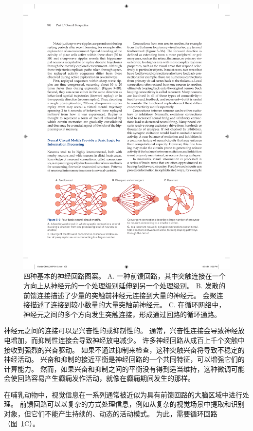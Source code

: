 \begin{figure}[htbp]
	\centering
	\includegraphics[width=1.0\linewidth]{chap05/fig_5_3}
	\caption{四种基本的神经回路图案。 
		A. 一种前馈回路，其中突触连接在一个方向上从神经元的一个处理级别延伸到另一个处理级别。 
		B. 发散的前馈连接描述了少量的突触前神经元连接到大量的神经元。 会聚连接描述了连接到较小数量的大量突触前神经元。 
		C. 在循环网络中，神经元之间的多个方向发生突触连接，形成通过回路的循环通路。}
	\label{fig:5_3}
\end{figure}


神经元之间的连接可以是兴奋性的或抑制性的。
通常，兴奋性连接会导致神经放电增加，而抑制性连接会导致神经放电减少。
许多神经回路从成百上千个突触中接收到强烈的兴奋驱动。
如果不通过抑制来检查，这种突触兴奋将导致不稳定的神经活动。
兴奋和抑制的接近平衡是神经回路的一个共同特征，可以增强它们的计算能力。
然而，如果兴奋和抑制之间的平衡没有得到适当维持，这种微调可能会使回路容易产生癫痫发作活动，就像在癫痫期间发生的那样。


在哺乳动物中，视觉信息在一系列通常被近似为具有前馈回路的大脑区域中进行处理。
前馈回路可以以复杂的方式处理信息，例如从复杂的视觉场景中提取和识别对象，但它们不能产生持续的、动态的活动模式。 
为此，需要循环回路（图~\ref{fig:5_3}C）。


